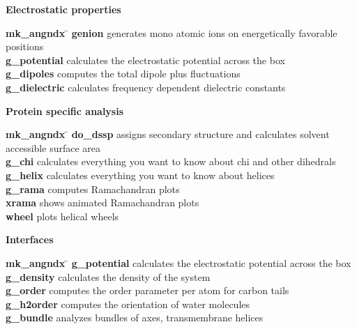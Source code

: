 \begin{description}
\item {\large\bf Electrostatic properties}
\vspace{-2ex}\begin{tabbing}
{\bf mk\_angndx} \= \kill
{\bf genion} \> generates mono atomic ions on energetically favorable positions \\
{\bf g\_potential} \> calculates the electrostatic potential across the box \\
{\bf g\_dipoles} \> computes the total dipole plus fluctuations \\
{\bf g\_dielectric} \> calculates frequency dependent dielectric constants \\
\end{tabbing}\vspace{-2ex}

\item {\large\bf Protein specific analysis}
\vspace{-2ex}\begin{tabbing}
{\bf mk\_angndx} \= \kill
{\bf do\_dssp} \> assigns secondary structure and calculates solvent accessible surface area \\
{\bf g\_chi} \> calculates everything you want to know about chi and other dihedrals \\
{\bf g\_helix} \> calculates everything you want to know about helices \\
{\bf g\_rama} \> computes Ramachandran plots \\
{\bf xrama} \> shows animated Ramachandran plots \\
{\bf wheel} \> plots helical wheels \\
\end{tabbing}\vspace{-2ex}

\item {\large\bf Interfaces}
\vspace{-2ex}\begin{tabbing}
{\bf mk\_angndx} \= \kill
{\bf g\_potential} \> calculates the electrostatic potential across the box \\
{\bf g\_density} \> calculates the density of the system \\
{\bf g\_order} \> computes the order parameter per atom for carbon tails \\
{\bf g\_h2order} \> computes the orientation of water molecules \\
{\bf g\_bundle} \> analyzes bundles of axes, {\eg} transmembrane helices \\
\end{tabbing}\vspace{-2ex}


\end{description}
